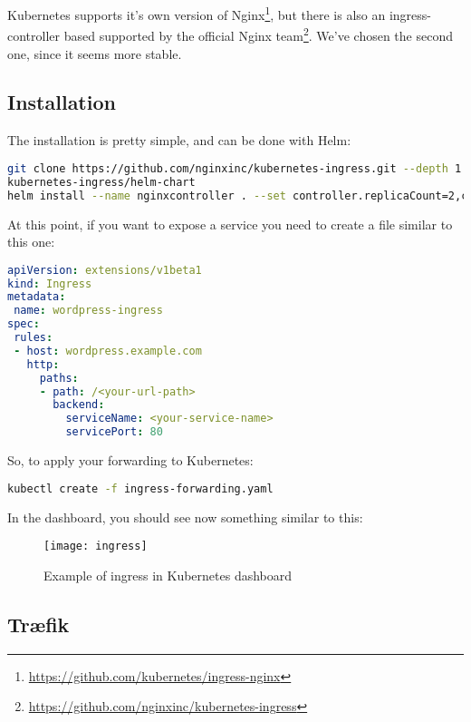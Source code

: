 Kubernetes supports it's own version of Nginx\footnote{
\url{https://github.com/kubernetes/ingress-nginx}}, but there is also an
ingress-controller based supported by the official Nginx team\footnote{
\url{https://github.com/nginxinc/kubernetes-ingress}}.
We've chosen the second one, since it seems more stable.

\subsection{Installation}\label{installation}

The installation is pretty simple, and can be done with Helm:

\begin{lstlisting}[language=bash]
git clone https://github.com/nginxinc/kubernetes-ingress.git --depth 1 # Clone the project repository
kubernetes-ingress/helm-chart
helm install --name nginxcontroller . --set controller.replicaCount=2,controller.service.type=NodePort,controller.service.externalTrafficPolicy=Cluster # Install the helm package
\end{lstlisting}

At this point, if you want to expose a service you need to create a file
similar to this one:

\begin{lstlisting}[language=yaml]
apiVersion: extensions/v1beta1
kind: Ingress
metadata:
 name: wordpress-ingress
spec:
 rules:
 - host: wordpress.example.com
   http:
     paths:
     - path: /<your-url-path>
       backend:
         serviceName: <your-service-name>
         servicePort: 80
\end{lstlisting}

So, to apply your forwarding to Kubernetes:

\begin{lstlisting}[language=bash]
kubectl create -f ingress-forwarding.yaml
\end{lstlisting}

In the dashboard, you should see now something similar to this:

\begin{figure}[htbp]
\centering
\texttt{[image: ingress]}
\caption{Example of ingress in Kubernetes dashboard}
\end{figure}

\subsection{Træfik}\label{truxe6fik}

